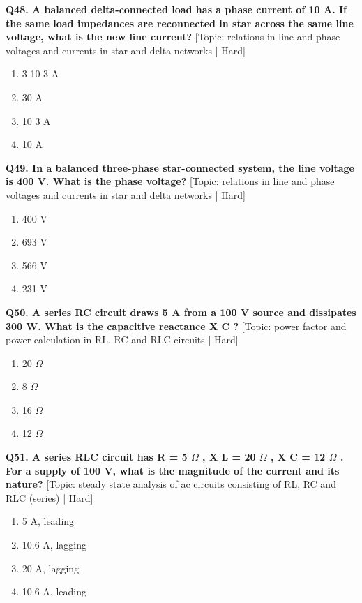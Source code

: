 \noindent\textbf{Q48. A balanced delta-connected load has a phase current of 10 A. If the same load impedances are reconnected in star across the same line voltage, what is the new line current?} \hfill [Topic: relations in line and phase voltages and currents in star and delta networks | Hard]
\begin{enumerate}[label=(\alph*),topsep=2pt,itemsep=1pt,partopsep=0pt,parsep=0pt]
    \item {3 10 3 A}
    \item {30 A}
    \item {10 3 A}
    \item {10 A}
\end{enumerate}
\vspace{2mm}

\noindent\textbf{Q49. In a balanced three-phase star-connected system, the line voltage is 400 V. What is the phase voltage?} \hfill [Topic: relations in line and phase voltages and currents in star and delta networks | Hard]
\begin{enumerate}[label=(\alph*),topsep=2pt,itemsep=1pt,partopsep=0pt,parsep=0pt]
    \item {400 V}
    \item {693 V}
    \item {566 V}
    \item {231 V}
\end{enumerate}
\vspace{2mm}

\noindent\textbf{Q50. A series RC circuit draws 5 A from a 100 V source and dissipates 300 W. What is the capacitive reactance X C ?} \hfill [Topic: power factor and power calculation in RL, RC and RLC circuits | Hard]
\begin{enumerate}[label=(\alph*),topsep=2pt,itemsep=1pt,partopsep=0pt,parsep=0pt]
    \item {20 $\Omega$}
    \item {8 $\Omega$}
    \item {16 $\Omega$}
    \item {12 $\Omega$}
\end{enumerate}
\vspace{2mm}

\noindent\textbf{Q51. A series RLC circuit has R = 5 $\Omega$ , X L = 20 $\Omega$ , X C = 12 $\Omega$ . For a supply of 100 V, what is the magnitude of the current and its nature?} \hfill [Topic: steady state analysis of ac circuits consisting of RL, RC and RLC (series) | Hard]
\begin{enumerate}[label=(\alph*),topsep=2pt,itemsep=1pt,partopsep=0pt,parsep=0pt]
    \item {5 A, leading}
    \item {10.6 A, lagging}
    \item {20 A, lagging}
    \item {10.6 A, leading}
\end{enumerate}
\vspace{2mm}

